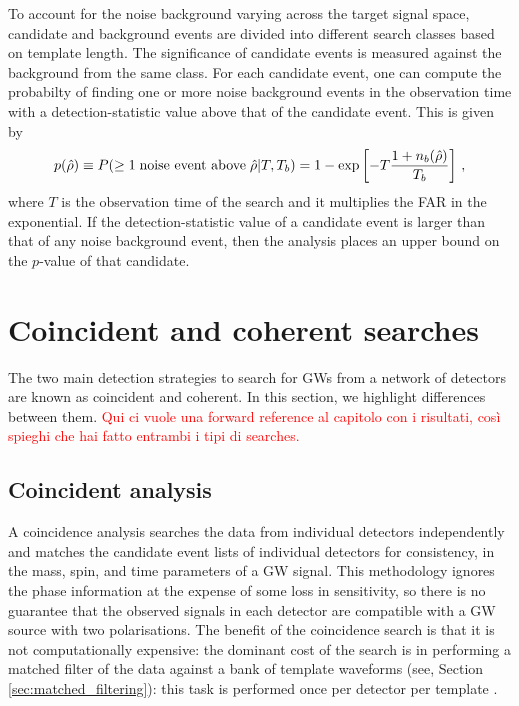 \documentclass[binding=0.6cm, LaM]{sapthesis}
\newcommand{\fpg}[1]{\textcolor{red}{#1} }
\begin{document}
	To account for the noise background varying across the target signal space, 
	candidate and background events are divided into different search classes based on template length. 
	The significance of candidate events is measured against the background from the same class. 
	For each candidate event, one can compute the probabilty of finding one or more 
	noise background events in the observation time with a detection-statistic value above that of the candidate event.  This is given by 
		\begin{equation}
			p(\hat \rho) \equiv P(\geq 1 \hspace*{0.1cm}\text{noise event above}\hspace*{0.1cm} \hat \rho|T,T_b) = 1 - \exp\left[-T{{1+n_b(\hat \rho)} \over{T_b}}\right]\,,
		\end{equation}
	where $T$ is the observation time of the search and it multiplies the FAR in the exponential.
	If the detection-statistic value of a candidate event is larger 
	than that of any noise background event, 
	then the analysis places an upper bound on the $p$-value of that candidate. 
	

\section{Coincident and coherent searches}

	The two main detection strategies to search for GWs 	
	from a network of detectors are known as coincident and coherent.  In this section, we highlight differences between them.  \fpg{Qui ci vuole una forward reference al capitolo con i risultati, cos\`i spieghi che hai fatto entrambi i tipi di searches.}

\subsection{Coincident analysis}

	A coincidence analysis searches the data from individual detectors independently 	
	and matches the candidate event lists of individual detectors for consistency,
	in the mass, spin, and time parameters of a GW signal.
	This methodology ignores the phase information at the expense of some loss in sensitivity, 
	so there is no guarantee that the observed signals in each detector 
	are compatible with a GW source with two polarisations.
	The benefit of the coincidence search is that it is not computationally expensive: 
	the dominant cost of the search is in performing a matched filter 
	of the data against a bank of template waveforms (see, Section \ref{sec:matched_filtering}):
        this task is performed once per detector per template \cite{28, 45}.
\end{document}
